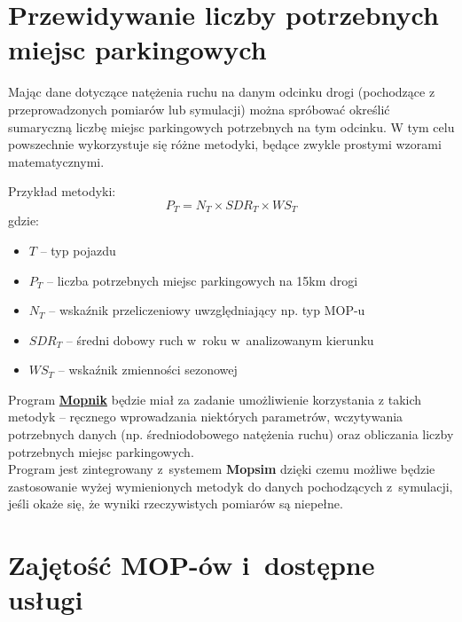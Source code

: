 \section{Przewidywanie liczby potrzebnych miejsc parkingowych}
Mając dane dotyczące natężenia ruchu na danym odcinku drogi (pochodzące z
przeprowadzonych pomiarów lub symulacji) można spróbować określić sumaryczną
liczbę miejsc parkingowych potrzebnych na tym odcinku. W tym celu powszechnie
wykorzystuje się różne metodyki, będące zwykle prostymi wzorami matematycznymi.

Przykład metodyki: 
$$ P_T = N_T \times SDR_T \times WS_T $$
gdzie:
\begin{itemize}
  \item $T$ -- typ pojazdu
  \item $P_T$ -- liczba potrzebnych miejsc parkingowych na 15km drogi
  \item $N_T$ -- wskaźnik przeliczeniowy uwzględniający np. typ MOP-u
  \item $SDR_T$ -- średni dobowy ruch w~roku w~analizowanym kierunku 
  \item $WS_T$ -- wskaźnik zmienności sezonowej
\end{itemize}
Program \hyperref[r:mopnik]{\textbf{Mopnik}} będzie miał za zadanie umożliwienie korzystania z
takich metodyk -- ręcznego wprowadzania niektórych parametrów,
wczytywania potrzebnych danych (np. średniodobowego natężenia ruchu)
oraz obliczania liczby potrzebnych miejsc parkingowych. \\
Program jest zintegrowany z~systemem \textbf{Mopsim} dzięki
czemu możliwe będzie zastosowanie wyżej wymienionych metodyk do danych
pochodzących z~symulacji, jeśli okaże się, że wyniki rzeczywistych pomiarów są
niepełne. 


\section{Zajętość MOP-ów i~dostępne usługi}


